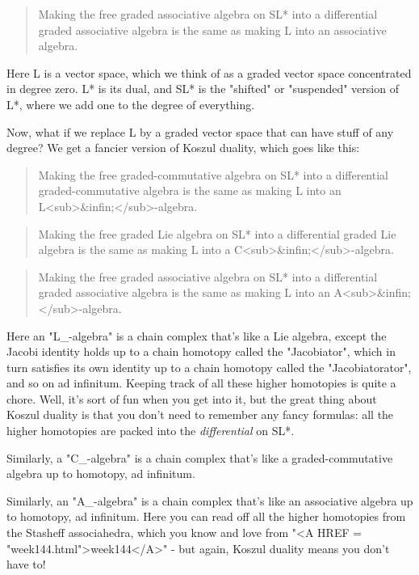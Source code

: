 \begin{quote}
 Making the free graded associative algebra on SL* into a differential
 graded associative algebra is the same as making L into an associative
 algebra.
\end{quote}
    

Here L is a vector space, which we think of as a graded vector space
concentrated in degree zero.  L* is its dual, and SL* is the
"shifted" or "suspended" version of L*, where we
add one to the degree of everything.

Now, what if we replace L by a graded vector space that can have stuff
of any degree?  We get a fancier version of Koszul duality, which goes
like this:

\begin{quote}
 Making the free graded-commutative algebra on SL* into a differential
 graded-commutative algebra is the same as making L into an L<sub>&infin;</sub>-algebra. 
\end{quote}
    

\begin{quote}
 Making the free graded Lie algebra on SL* into a differential
 graded Lie algebra is the same as making L into a C<sub>&infin;</sub>-algebra.
\end{quote}
    

\begin{quote}
 Making the free graded associative algebra on SL* into a differential
 graded associative algebra is the same as making L into an A<sub>&infin;</sub>-algebra.
\end{quote}
    


Here an "L_{\infty }-algebra" is a chain complex
that's like a Lie algebra, except the Jacobi identity holds up to a
chain homotopy called the "Jacobiator", which in turn
satisfies its own identity up to a chain homotopy called the
"Jacobiatorator", and so on ad infinitum.  Keeping track of
all these higher homotopies is quite a chore.  Well, it's sort of fun
when you get into it, but the great thing about Koszul duality is that
you don't need to remember any fancy formulas: all the higher
homotopies are packed into the \emph{differential} on SL*.
 
Similarly, a "C_{\infty }-algebra" is a chain
complex that's like a graded-commutative algebra up to homotopy, ad
infinitum.

Similarly, an "A_{\infty }-algebra" is a chain
complex that's like an associative algebra up to homotopy, ad
infinitum.  Here you can read off all the higher homotopies from the
Stasheff associahedra, which you know and love from "<A HREF =
"week144.html">week144</A>" - but again, Koszul duality means you
don't have to!

